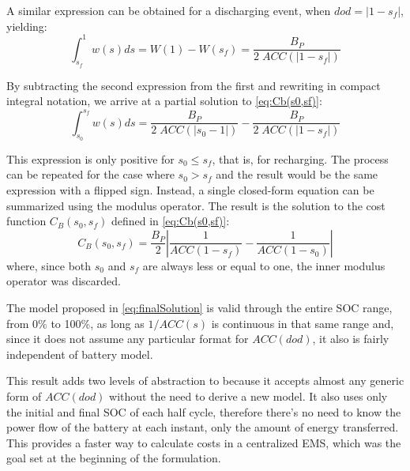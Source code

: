 \documentclass{ieeeaccess}
\begin{document}
    A similar expression can be obtained for a discharging event, when $dod=|1-s_{f}|$, yielding:
    \small
         $$ \int_{s_{f}}^{1}w(s)ds = W(1) - W(s_{f}) = \frac{B_{P}}{2 \; ACC(|1-s_{f}|)} $$
	\normalsize

    By subtracting the second expression from the first and rewriting in compact integral notation, we arrive at a partial solution to \eqref{eq:Cb(s0,sf)}:
    \small
       $$ \int_{s_{0}}^{s_{f}}w(s)ds = \frac{B_{P}}{2 \; ACC(|s_{0}-1|)} - \frac{B_{P}}{2 \; ACC(|1-s_{f}|)} $$
	\normalsize

    This expression is only positive for $s_{0} \le s_{f}$, that is, for recharging. The process can be repeated for the case where $s_{0} > s_{f}$ and the result would be the same expression with a flipped sign. Instead, a single closed-form equation can be summarized using the modulus operator. The result is the solution to the cost function $C_{B}(s_{0}, s_{f})$ defined in \eqref{eq:Cb(s0,sf)}:
    \small
    \begin{equation}
        C_{B}(s_{0}, s_{f}) = \frac{B_{P}}{2} \left| \frac{1}{ACC(1-s_{f})} - \frac{1}{ACC(1-s_{0})} \right|
        \label{eq:finalSolution}
    \end{equation}
	\normalsize
    where, since both $s_{0}$ and $s_{f}$ are always less or equal to one, the inner modulus operator was discarded.

    The model proposed in \eqref{eq:finalSolution} is valid through the entire \ac{SOC} range, from 0\% to 100\%, as long as $1/ACC(s)$ is continuous in that same range and, since it does not assume any particular format for $ACC(dod)$, it also is fairly independent of battery model.

    This result adds two levels of abstraction to \cite{HAN2014} because it accepts almost any generic form of $ACC(dod)$ without the need to derive a new model. It also uses only the initial and final \ac{SOC} of each half cycle, therefore there's no need to know the power flow of the battery at each instant, only the amount of energy transferred. This provides a faster way to calculate costs in a centralized \ac{EMS}, which was the goal set at the beginning of the formulation.
\end{document}
